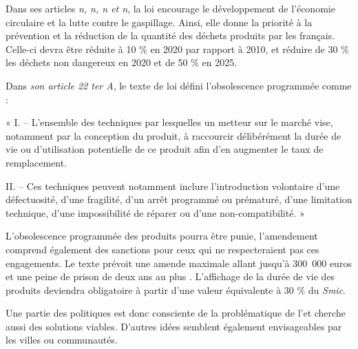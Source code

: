 \bigbreak
Dans ses articles \textit{n, n, n et n}, la loi encourage le développement de l’économie circulaire et la lutte contre le gaspillage. Ainsi, elle donne la priorité à la prévention et la réduction de la quantité des déchets produits par les français. Celle-ci devra être réduite à 10 \%  en 2020 par rapport à 2010, et réduire de 30 \% les déchets non dangereux en 2020 et de 50 \% en 2025.


\bigbreak
Dans \textit{son article 22 ter A}, le texte de loi défini l’obsolescence programmée comme :

\begin{itshape}« I. – L’ensemble des techniques par lesquelles un metteur sur le marché vise, notamment par la conception du produit, à raccourcir délibérément la durée de vie ou d’utilisation potentielle de ce produit afin d’en augmenter le taux de remplacement.

II. – Ces techniques peuvent notamment inclure l’introduction volontaire d’une défectuosité, d’une fragilité, d’un arrêt programmé ou prématuré, d’une limitation technique, d’une impossibilité de réparer ou d’une non-compatibilité. »
\end{itshape}

\bigbreak
L’obsolescence programmée des produits pourra être punie, l’amendement comprend également des sanctions pour ceux qui ne respecteraient pas ces engagements. Le texte prévoit une amende maximale allant jusqu'à 300~000 euros et une peine de prison de deux ans au plus \cite{sanctionloi}. L'affichage de la durée de vie des produits deviendra obligatoire à partir d'une valeur équivalente à 30 \% du \textit{Smic}.


Une partie des politiques est donc consciente de la problématique de l'\op et cherche aussi des solutions viables. D'autres idées semblent également envisageables par les villes ou communautés.
